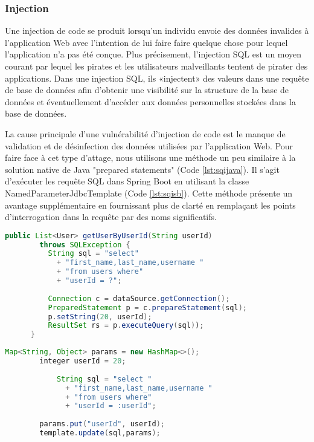    \subsubsection{Injection}
    Une injection de code se produit lorsqu'un individu envoie des données 
    invalides à l'application Web avec l'intention de lui faire faire quelque 
    chose pour lequel l'application n'a pas été conçue. Plus précisement,
    l'injection SQL est un moyen courant par lequel les pirates et les 
    utilisateurs malveillants tentent de pirater des applications. Dans une 
    injection SQL, ils «injectent» des valeurs dans une requête de base de 
    données afin d’obtenir une visibilité sur la structure de la base de 
    données et éventuellement d’accéder aux données personnelles stockées 
    dans la base de données.
    \par 
    La cause principale d'une vulnérabilité d'injection de code est le manque 
    de validation et de désinfection des données utilisées par l'application Web.
    Pour faire face à cet type d'attage, nous utilisons une méthode un peu similaire
    à la solution native de Java "prepared statements" (Code \ref{lst:sqijava}). Il s'agit d'exécuter les 
    requête SQL dans Spring Boot en utilisant la classe NamedParameterJdbcTemplate (Code \ref{lst:sqisb}). 
    Cette méthode présente un avantage supplémentaire en fournissant plus de clarté en 
    remplaçant les points d'interrogation dans la requête par des noms significatifs.
    \begin{lstlisting}[caption={Éviter SQi en Java: Prepared statements},label={lst:sqijava},language=Java]
        public List<User> getUserByUserId(String userId)
        throws SQLException {    
          String sql = "select"
            + "first_name,last_name,username "
            + "from users where"
            + "userId = ?";
          
          Connection c = dataSource.getConnection();
          PreparedStatement p = c.prepareStatement(sql);
          p.setString(20, userId);
          ResultSet rs = p.executeQuery(sql)); 
      }
    \end{lstlisting}

    \begin{lstlisting}[caption={Éviter SQi avec Spring Boot: NamedParameterJdbcTemplate},label={lst:sqisb},language=Java]
        Map<String, Object> params = new HashMap<>();
        integer userId = 20;
        
            String sql = "select "
              + "first_name,last_name,username "
              + "from users where"
              + "userId = :userId";
        
        params.put("userId", userId);
        template.update(sql,params);
    \end{lstlisting}